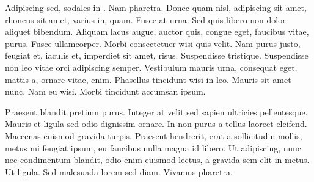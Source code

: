 Adipiscing sed, sodales in . Nam pharetra. Donec quam nisl,
adipiscing sit amet, rhoncus sit amet, varius in, quam. Fusce at
urna. Sed quis libero non dolor aliquet bibendum. Aliquam lacus
augue, auctor quis, congue eget, faucibus vitae, purus. Fusce
ullamcorper. Morbi consectetuer wisi quis velit. Nam purus justo,
feugiat et, iaculis et, imperdiet sit amet, risus. Suspendisse
tristique. Suspendisse non leo vitae orci adipiscing semper.
Vestibulum mauris urna, consequat eget, mattis a, ornare vitae,
enim. Phasellus tincidunt wisi in leo. Mauris sit amet nunc. Nam
eu wisi. Morbi tincidunt accumsan ipsum.



Praesent blandit pretium purus. Integer at velit sed sapien
ultricies pellentesque. Mauris et ligula sed odio dignissim
ornare. In non purus a tellus laoreet eleifend. Maecenas euismod
gravida turpis. Praesent hendrerit, erat a sollicitudin mollis,
metus mi feugiat ipsum, eu faucibus nulla magna id libero. Ut
adipiscing, nunc nec condimentum blandit, odio enim euismod
lectus, a gravida sem elit in metus. Ut ligula. Sed malesuada
lorem sed diam. Vivamus pharetra.

